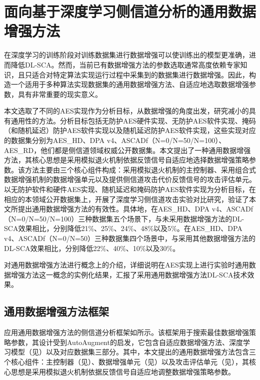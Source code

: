 \chapter{面向基于深度学习侧信道分析的通用数据增强方法}\label{chap:search1}{
	
	在深度学习的训练阶段对训练数据集进行数据增强可以使训练出的模型更准确，进而降低DL-SCA\chenggongtiaoshu 。然而，当前已有数据增强方法的参数选取通常高度依赖专家知识，且只适合对特定算法实现运行过程中采集到的数据集进行数据增强。因此，构造一个适用于多种算法实现数据集的通用数据增强方法、自适应地选取数据增强参数，具有非常重要的现实意义。
	
	本文选取了不同的AES实现作为分析目标，从数据增强的角度出发，研究减小\chenggongtiaoshu 的具有通用性的方法。分析目标包括无防护AES硬件实现、无防护AES软件实现、掩码（和随机延迟）防护AES软件实现以及随机延迟防护AES软件实现，这些实现对应的数据集分别为AES\_HD、DPA v4、ASCADf（N=0/N=50/N=100）、AES\_RD，他们都是侧信道领域权威公开数据集。本文提出了一种通用数据增强方法，其核心思想是采用模拟退火机制依据反馈信号自适应地选择数据增强策略参数。该方法主要由三个核心组件构成：采用模拟退火机制的主控制器、采用组合式数据增强机制的数据增强单元以及提供侧信道攻击代价反馈信号的攻击评估单元。以无防护软件和硬件AES实现、随机延迟和掩码防护AES软件实现为分析目标，在相应的本领域公开数据集上，开展了深度学习侧信道攻击实验对比研究，验证了本文所提出通用数据增强方法的有效性。具体地，在AES\_HD、DPA v4、ASCADf（N=0/N=50/N=100）三种数据集五个场景下，与未采用数据增强方法的DL-SCA效果相比，\chenggongtiaoshu 分别降低21\%、25\%、24\%、48\%以及5\%。在AES\_HD、DPA v4、ASCADf（N=0/N=50）三种数据集四个场景中，与采用其他数据增强方法的DL-SCA效果相比，\chenggongtiaoshu 分别降低22\%、40\%、10\%以及30\%。
	
	{\color{\xchange}
	
	对通用数据增强方法进行概念上的介绍，详细说明在AES实现上进行实验时通用数据增强方法这一概念的实例化结果，汇报了采用通用数据增强方法DL-SCA技术效果。
	}
	
	\section{通用数据增强方法框架}\label{sec:framework}
	应用通用数据增强方法的侧信道分析框架如所示。该框架用于搜索最佳数据增强策略参数，其设计受到AutoAugment\citep{Cubuk19}的启发，它包含自适应数据增强方法、深度学习模型（见）以及对应数据集三部分。其中，本文提出的通用数据增强方法包含三个核心组件：主控制器（见）、数据增强单元（见）以及攻击评估单元（见），其核心思想是采用模拟退火机制依据反馈信号自适应地调整数据增强策略参数。
	
}
